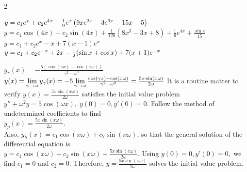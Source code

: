 \begin{multicols}{2}
\begin{Answer}[ref={EX33}]
\begin{tasks}
		\task \(y=c_1 e^x+c_2 e^{4 x}\\+\frac{1}{9} e^x \left(9x e^{3 x} -3 e^{3 x}-15 x-5\right)\)		
		\task \(y= c_1 \cos (4 x)+c_2 \sin (4 x)+\frac{1}{128} \left(8 x^3-3 x+8\right) +\frac{1}{6}e^{4 x}+\frac{\sin x}{15}\)
		\task \(y=c_1+c_2e^x-x+ 7 (x-1)e^x\)
		\task \(y= c_1 +c_2 e^{-x}+2x -\frac{1}{2}(\sin x+\cos x)\\+7 (x+1)e^{-x}\)
	\end{tasks}
	\Question \label{3-3-9a}
	\begin{tasks}	
		\task \(y_\gamma(x)= -\frac{5 (\cos (\gamma  x)-\cos (x \omega ))}{\gamma ^2-\omega ^2}\)
		\task \(y(x) = \lim\limits_{\gamma\to\omega}y_\gamma(x)\\ = -5\lim\limits_{\gamma\to\omega}\frac{\cos (\gamma  x)-\cos (x \omega )}{\gamma ^2-\omega ^2}\\=\frac{5 x \sin (x \omega )}{2 \omega }\)
		\task It is a routine matter to verify \(y(x) =\frac{5 x \sin (x \omega )}{2 \omega }\) satisfies the initial value problem \(y''+\omega^2 y = 5 \cos(\omega x), \; y(0) = 0, y'(0) = 0.\)
		\task  Follow the method of undetermined coefficients
		to find \\\(y_p(x) = \frac{5  x   \sin (x \omega )}{2 \omega}.\)\\ Also, \(y_h(x) =c_1 \cos (x \omega )+c_2 \sin (x \omega ) \), so that the general solution of the differential equation is\\
		\(y = c_1 \cos (x \omega )+c_2 \sin (x \omega )+\frac{5  x   \sin (x \omega )}{2 \omega}.\) Using $y(0) = 0, y'(0) = 0,$ we find $c_1=0$ and $c_2=0$. Therefore, \(y=\frac{5  x   \sin (x \omega )}{2 \omega}\) solves the initial value problem.
	\end{tasks}
	

\end{Answer}
\end{multicols}
